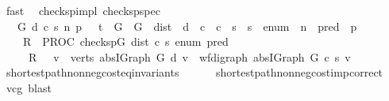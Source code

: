 \begin{isabellebody}
\ fast%
\endisatagproof
{\isafoldproof}%
%
\isadelimproof
\isanewline
%
\endisadelimproof
\isanewline
{}\isamarkupfalse%
\ {\isacharparenleft}\ check{\isacharunderscore}sp{\isacharunderscore}impl{\isacharparenright}\ check{\isacharunderscore}sp{\isacharunderscore}spec{\isacharcolon}\isanewline
\ \ {\isachardoublequoteopen}{\isasymforall}\ G\ d\ c\ s\ n\ p\ {\isachardot}\ {\isasymGamma}\ {\isasymturnstile}\isactrlsub t\ {\isasymlbrace}\ {\isasymacute}G\ {\isacharequal}\ G\ {\isasymand}\ {\isasymacute}dist\ {\isacharequal}\ d\ {\isasymand}\ {\isasymacute}c\ {\isacharequal}\ c\ {\isasymand}\ {\isasymacute}s\ {\isacharequal}\ s\ {\isasymand}\ {\isasymacute}enum\ {\isacharequal}\ n\ {\isasymand}\ {\isasymacute}pred\ {\isacharequal}\ p\ {\isasymrbrace}\isanewline
\ \ \ \ {\isasymacute}R\ {\isacharcolon}{\isacharequal}{\isacharequal}\ PROC\ check{\isacharunderscore}sp{\isacharparenleft}{\isasymacute}G{\isacharcomma}\ {\isasymacute}dist{\isacharcomma}\ {\isasymacute}c{\isacharcomma}\ {\isasymacute}s{\isacharcomma}\ {\isasymacute}enum{\isacharcomma}\ {\isasymacute}pred{\isacharparenright}\isanewline
\ \ \ \ {\isasymlbrace}\ {\isasymacute}R\ {\isasymlongrightarrow}\ \ {\isacharparenleft}{\isasymforall}v\ {\isasymin}\ verts\ {\isacharparenleft}abs{\isacharunderscore}IGraph\ G{\isacharparenright}{\isachardot}\ d\ v\ {\isacharequal}\ wf{\isacharunderscore}digraph{\isachardot}{\isasymmu}\ {\isacharparenleft}abs{\isacharunderscore}IGraph\ G{\isacharparenright}\ c\ s\ v{\isacharparenright}{\isasymrbrace}{\isachardoublequoteclose}\isanewline
%
\isadelimproof
%
\endisadelimproof
%
\isatagproof
{}\isamarkupfalse%
\ shortest{\isacharunderscore}path{\isacharunderscore}non{\isacharunderscore}neg{\isacharunderscore}cost{\isacharunderscore}eq{\isacharunderscore}invariants\isanewline
\ \ \ \ \ \ shortest{\isacharunderscore}path{\isacharunderscore}non{\isacharunderscore}neg{\isacharunderscore}cost{\isacharunderscore}imp{\isacharunderscore}correct\ \isanewline
{}\isamarkupfalse%
\ vcg\ blast%
\endisatagproof
{\isafoldproof}%
%
\isadelimproof
\isanewline
%
\endisadelimproof
%
\isadelimtheory
\isanewline
%
\endisadelimtheory
%
\isatagtheory
{}\isamarkupfalse%
%
\endisatagtheory
{\isafoldtheory}%
%
\isadelimtheory
%
\endisadelimtheory
\end{isabellebody}%
